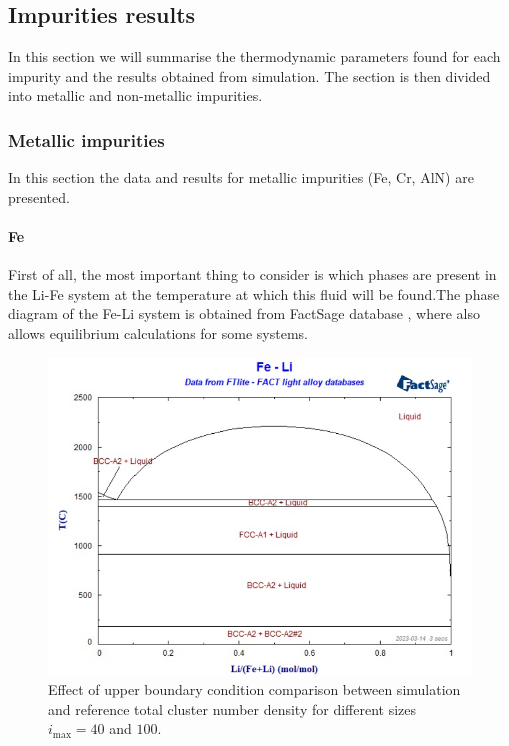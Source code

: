 \subsection{Impurities results}
In this section we will summarise the thermodynamic parameters found for each impurity and the results obtained from simulation.
The section is then divided into metallic and non-metallic impurities. 
\subsubsection{Metallic impurities}
In this section the data and results for metallic impurities (Fe, Cr, AlN) are presented.
\paragraph{Fe}

First of all, the most important thing to consider is which phases are present in the Li-Fe system at the temperature at 
which this fluid will be found.The phase diagram of the Fe-Li system is obtained from FactSage database \cite{Bale2016}, where also allows 
equilibrium calculations for some systems.
\begin{figure}[H]
    \centering
    \includegraphics[width=0.9\linewidth]{Fe-Li_phase_diagram.png}
    \caption{Effect of upper boundary condition comparison between simulation and reference total cluster number density for different sizes $i_{\text{max}} = 40$ and $100$.}
    \label{fig:fe_li_diagram}
\end{figure}

